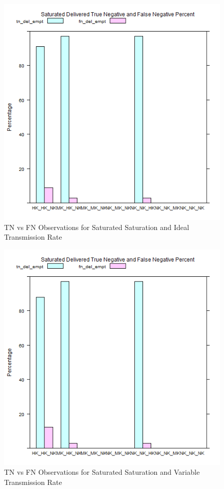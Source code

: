 	\begin{figure}[H]
	\centering
	\includegraphics[width=\textwidth]{Chap7/figures/plots/saturated_ideal/tnvsfn_percent.png}
	\caption{TN vs FN Observations for Saturated Saturation and Ideal Transmission Rate}
	\label{fig:sim:res:sat:ideal:tnfn}
	\end{figure}

	\begin{figure}[H]
	\centering
	\includegraphics[width=\textwidth]{Chap7/figures/plots/saturated_variable/tnvsfn_percent.png}
	\caption{TN vs FN Observations for Saturated Saturation and Variable Transmission Rate}
	\label{fig:sim:res:sat:variable:tnfn}
	\end{figure}

